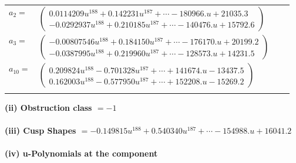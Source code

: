 \documentclass[1p]{elsarticle_modified}
\theoremstyle{definition}
\begin{document}
\begin{tabular}{m{7pt} m{180pt} m{7pt} m{180pt} }
\flushright $a_{2}=$&$\begin{pmatrix}0.0114209 u^{188}+0.142231 u^{187}+\cdots-180966. u+21035.3\\-0.0292937 u^{188}+0.210185 u^{187}+\cdots-140476. u+15792.6\end{pmatrix}$ \\
\flushright $a_{3}=$&$\begin{pmatrix}-0.00807546 u^{188}+0.184150 u^{187}+\cdots-176170. u+20199.2\\-0.0387995 u^{188}+0.219960 u^{187}+\cdots-128573. u+14231.5\end{pmatrix}$ \\
\flushright $a_{10}=$&$\begin{pmatrix}0.209824 u^{188}-0.701328 u^{187}+\cdots+141674. u-13437.5\\0.162003 u^{188}-0.577950 u^{187}+\cdots+152208. u-15269.2\end{pmatrix}$\\&\end{tabular}
\flushleft \textbf{(ii) Obstruction class $= -1$}\\~\\
\flushleft \textbf{(iii) Cusp Shapes $= -0.149815 u^{188}+0.540340 u^{187}+\cdots-154988. u+16041.2$}\\~\\
\newpage\renewcommand{\arraystretch}{1}
\flushleft \textbf{(iv) u-Polynomials at the component}\newline \\
\end{document}
